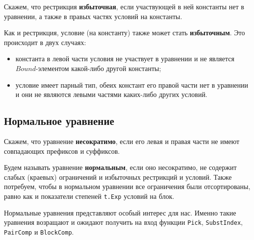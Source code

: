 \documentclass[12pt]{article}
\begin{document}
Скажем, что рестрикция \textbf{избыточная}, если участвующей в ней константы
нет в уравнении, а также в правых частях условий на константы.

Как и рестрикция, условие (на константу) также может стать \textbf{избыточным}.
Это происходит в двух случаях:
\begin{itemize}
  \item константа в левой части условия не участвует в уравнении и не является
  $Bound$-элементом какой-либо другой константы;
  \item условие имеет парный тип, обеих констант его правой части нет
  в уравнении и они не являются левыми частями каких-либо других условий.
\end{itemize}

\subsection{Нормальное уравнение}

Скажем, что уравнение \textbf{несократимо}, если его левая и правая части не
имеют совпадающих префиксов и суффиксов.

Будем называть уравнение \textbf{нормальным}, если оно несократимо, не содержит
слабых (краевых) ограничений и избыточных рестрикций и условий. Также
потребуем, чтобы в нормальном уравнении все ограничения были отсортированы,
равно как и показатели степеней \texttt{t.Exp} условий на блок.

Нормальные уравнения представляют особый интерес для нас. Именно такие уравнения
возращают и ожидают получить на вход функции \texttt{Pick}, \texttt{SubstIndex},
\texttt{PairComp} и \texttt{BlockComp}.
\end{document}
